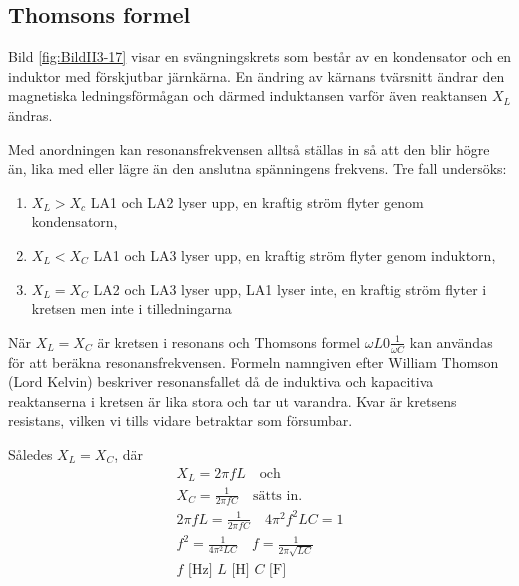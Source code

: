 \subsection{Thomsons formel}


Bild \ref{fig:BildII3-17} visar en svängningskrets som består av en
kondensator och en induktor med förskjutbar järnkärna.
En ändring av kärnans tvärsnitt ändrar den magnetiska ledningsförmågan och
därmed induktansen varför även reaktansen \(X_L\) ändras.

Med anordningen kan resonansfrekvensen alltså ställas in så att den blir högre än,
lika med eller lägre än den anslutna spänningens frekvens.
Tre fall undersöks:
\begin{enumerate}
\item \(X_L > X_c\) LA1 och LA2 lyser upp, en kraftig ström flyter genom
  kondensatorn,
\item \(X_L < X_C\) LA1 och LA3 lyser upp, en kraftig ström flyter genom
  induktorn,
\item \(X_L= X_C\) LA2 och LA3 lyser upp, LA1 lyser inte, en kraftig ström
  flyter i kretsen men inte i tilledningarna

\end{enumerate}

När \(X_L = X_C\) är kretsen i resonans och Thomsons formel
\(\omega L 0 \frac{1}{\omega C}\) kan användas för att beräkna
resonansfrekvensen.
Formeln namngiven efter William Thomson (Lord Kelvin) beskriver resonansfallet
då de induktiva och kapacitiva reaktanserna i kretsen är lika stora och tar ut
varandra.
Kvar är kretsens resistans, vilken vi tills vidare betraktar som försumbar.

Således \(X_L = X_C\), där
%
\begin{gather*}
  X_L = 2\pi fL \quad \text{och} \\
  X_C = \frac{1}{2\pi fC} \quad \text{sätts in.} \\
  2\pi fL = \frac{1}{2\pi fC} \quad 4\pi ^2f^2LC = 1 \\
  f^2 = \frac{1}{4\pi ^2LC} \quad f = \frac{1}{2\pi \sqrt{LC}} \\
  f\text{ [Hz] }L\text{ [H] }C\text{ [F] } \\
\end{gather*}

